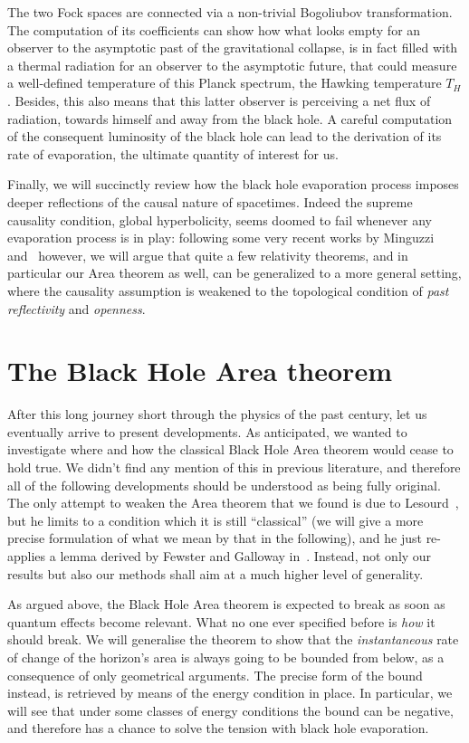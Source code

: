 The two Fock spaces are connected via a non-trivial Bogoliubov transformation. The computation of its coefficients can show how what looks empty for an observer to the asymptotic past of the gravitational collapse, is in fact filled with a thermal radiation for an observer to the asymptotic future, that could measure a well-defined temperature of this Planck spectrum, the Hawking temperature \(T_H\). Besides, this also means that this latter observer is perceiving a net flux of radiation, towards himself and away from the black hole. A careful computation of the consequent luminosity of the black hole can lead to the derivation of its rate of evaporation, the ultimate quantity of interest for us.

Finally, we will succinctly review how the black hole evaporation process imposes deeper reflections of the causal nature of spacetimes. Indeed the supreme causality condition, global hyperbolicity, seems doomed to fail whenever any evaporation process is in play: following some very recent works by Minguzzi~\cite[]{minguzzi2020gravitational} and~\cite[]{minguzzi2019lorentzian} however, we will argue that quite a few relativity theorems, and in particular our Area theorem as well, can be generalized to a more general setting, where the causality assumption is weakened to the topological condition of \emph{past reflectivity} and \emph{openness}.

\section{The Black Hole Area theorem}

After this long journey short through the physics of the past century, let us eventually arrive to present developments.
As anticipated, we wanted to investigate where and how the classical Black Hole Area theorem would cease to hold true. We didn't find any mention of this in previous literature, and therefore all of the following developments should be understood as being fully original. The only attempt to weaken the Area theorem that we found is due to Lesourd~\cite[]{lesourd2018remark}, but he limits to a condition which it is still ``classical'' (we will give a more precise formulation of what we mean by that in the following), and he just re-applies a lemma derived by Fewster and Galloway in~\cite[]{fewster2011singularity}. Instead, not only our results but also our methods shall aim at a much higher level of generality.

As argued above, the Black Hole Area theorem is expected to break as soon as quantum effects become relevant. What no one ever specified before is \emph{how} it should break. We will generalise the theorem to show that the \emph{instantaneous} rate of change of the horizon's area is always going to be bounded from below, as a consequence of only geometrical arguments. The precise form of the bound instead, is retrieved by means of the energy condition in place. In particular, we will see that under some classes of energy conditions the bound can be negative, and therefore has a chance to solve the tension with black hole evaporation.

